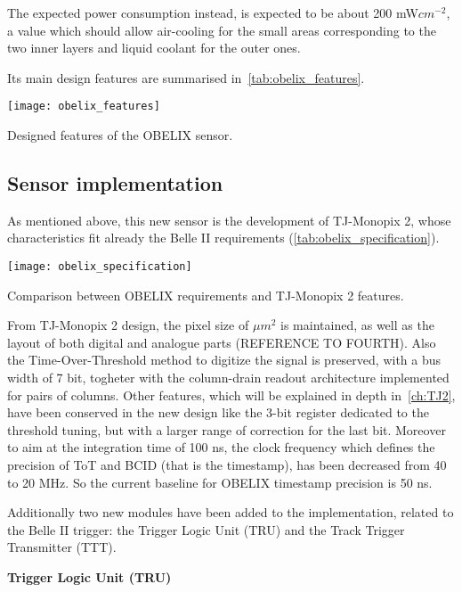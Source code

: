 The expected power consumption instead, is expected to be about 200 mW$cm^{-2}$, a value which should allow air-cooling for the small areas corresponding to the two inner layers and liquid coolant for the outer ones. 

Its main design features are summarised in~\autoref{tab:obelix_features}.


\begin{table}[h!]
\centering
\texttt{[image: obelix\_features]}
\caption{Designed features of the OBELIX sensor.}
\label{tab:obelix_features}
\end{table}



\subsection{Sensor implementation}

As mentioned above, this new sensor is the development of TJ-Monopix 2, whose characteristics fit already the Belle II requirements (\autoref{tab:obelix_specification}).\\

\begin{table}[h!]
\centering
\texttt{[image: obelix\_specification]}
\caption{Comparison between OBELIX requirements and TJ-Monopix 2 features.}
\label{tab:obelix_specification}
\end{table}

From TJ-Monopix 2 design, the pixel size of  $\mu m^{2}$ is maintained, as well as the layout of both digital and analogue parts (REFERENCE TO FOURTH). Also the Time-Over-Threshold method to digitize the signal is preserved, with a bus width of 7 bit, togheter with the column-drain readout architecture implemented for pairs of columns. Other features, which will be explained in depth in~\autoref{ch:TJ2}, have been conserved in the new design like the 3-bit register dedicated to the threshold tuning, but with a larger range of correction for the last bit. 
Moreover to aim at the integration time of 100 ns, the clock frequency which defines the precision of ToT and BCID (that is the timestamp), has been decreased from 40 to 20 MHz. So the current baseline for OBELIX timestamp precision is 50 ns.

Additionally two new modules have been added to the implementation, related to the Belle II trigger: the Trigger Logic Unit (TRU) and the Track Trigger Transmitter (TTT). 

\begin{description}
\item \textbf{Trigger Logic Unit (TRU)}
\end{description}

